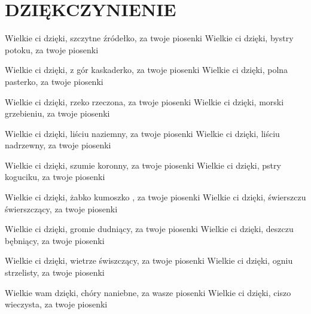 \documentclass[../../../songbook.tex]{subfiles}
\begin{document}
\TabPositions{9cm} %
\section*{DZIĘKCZYNIENIE}
{}
\vspace{0.5cm}
Wielkie ci dzięki, szczytne źródełko, za twoje piosenki  \newline
Wielkie ci dzięki, bystry potoku, za twoje piosenki 	 \newline

\-\hspace{1cm} Wielkie ci dzięki, z gór kaskaderko, za twoje piosenki \newline
\-\hspace{1cm} Wielkie ci dzięki, polna pasterko, za twoje piosenki \newline

Wielkie ci dzięki, rzeko rzeczona, za twoje piosenki \newline
Wielkie ci dzięki, morski grzebieniu, za twoje piosenki \newline

\-\hspace{1cm} Wielkie ci dzięki, liściu naziemny, za twoje piosenki \newline
\-\hspace{1cm} Wielkie ci dzięki, liściu nadrzewny, za twoje piosenki \newline

Wielkie ci dzięki, szumie koronny, za twoje piosenki \newline
Wielkie ci dzięki, pstry koguciku, za twoje piosenki \newline

\-\hspace{1cm} Wielkie ci dzięki, żabko kumoszko , za twoje piosenki \newline
\-\hspace{1cm} Wielkie ci dzięki, świerszczu świerszczący, za twoje piosenki \newline

Wielkie ci dzięki, gromie dudniący, za twoje piosenki \newline
\-\hspace{1cm} Wielkie ci dzięki, deszczu bębniący, za twoje piosenki \newline

\-\hspace{1cm} Wielkie ci dzięki, wietrze świszczący, za twoje piosenki \newline
Wielkie ci dzięki, ogniu strzelisty, za twoje piosenki \newline

\-\hspace{1cm} Wielkie wam dzięki, chóry naniebne, za wasze piosenki \newline
\-\hspace{1cm} Wielkie ci dzięki, ciszo wieczysta, za twoje piosenki \newline
\end{document}

